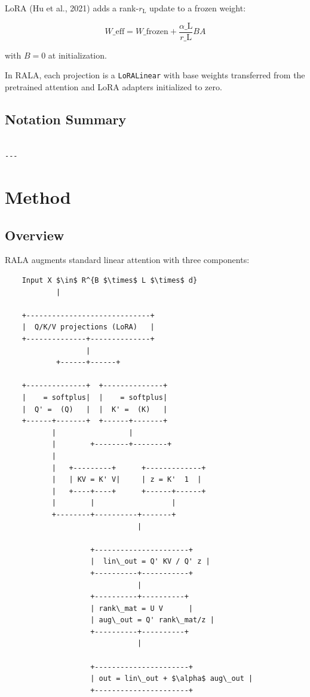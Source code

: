 LoRA (Hu et al., 2021) adds a rank-$r_{\text{L}}$ update to a frozen 
weight:

\[
W\_\text{eff} = W\_\text{frozen} + \frac{\alpha\_{\text{L}}}{r\_{\text{L}}} B A
\tag{3.7}
\]

with $B = 0$ at initialization.

In RALA, each projection is a \texttt{LoRALinear} with base weights transferred 
from the pretrained attention and LoRA adapters initialized to zero.

\subsection{Notation Summary}

\begin{lstlisting}

---
\end{lstlisting}


\section{Method}

\subsection{Overview}

RALA augments standard linear attention with three components:

\begin{lstlisting}
    Input X $\in$ R^{B $\times$ L $\times$ d}
            |
             
    +-----------------------------+
    |  Q/K/V projections (LoRA)   |
    +--------------+--------------+
                   |
            +------+------+
                           
    +--------------+  +--------------+
    |    = softplus|  |    = softplus|
    |  Q' =  (Q)   |  |  K' =  (K)   |
    +------+-------+  +------+-------+
           |                 |
           |        +--------+--------+
           |                           
           |   +---------+      +-------------+
           |   | KV = K' V|     | z = K'  1  |
           |   +----+----+      +------+------+
           |        |                  |
           +--------+----------+-------+
                               |
                                
                    +----------------------+
                    |  lin\_out = Q' KV / Q' z |
                    +----------+-----------+
                               |
                    +----------+----------+
                    | rank\_mat = U V      |
                    | aug\_out = Q' rank\_mat/z |
                    +----------+----------+
                               |
                                
                    +----------------------+
                    | out = lin\_out + $\alpha$ aug\_out |
                    +----------------------+
\end{lstlisting}

